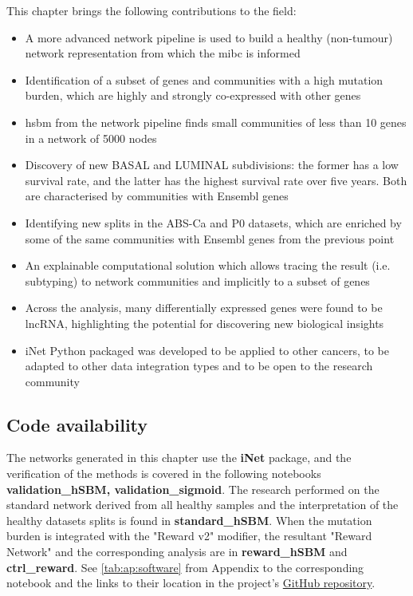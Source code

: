 This chapter brings the following contributions to the field:
\begin{itemize}
    \item A more advanced network pipeline is used to build a healthy (non-tumour) network representation from which the \acrshort{mibc} is informed
    \item Identification of a subset of genes and communities with a high mutation burden, which are highly and strongly co-expressed with other genes
    \item \acrlong{hsbm} from the network pipeline finds small communities of less than 10 genes in a network of 5000 nodes
    \item Discovery of new \gls{BASAL} and \gls{LUMINAL} subdivisions: the former has a low survival rate, and the latter has the highest survival rate over five years. Both are characterised by communities with Ensembl genes
    \item Identifying new splits in the ABS-Ca and P0 datasets, which are enriched by some of the same communities with Ensembl genes from the previous point 
    \item An explainable computational solution which allows tracing the result (i.e. subtyping) to network communities and implicitly to a subset of genes
    \item Across the analysis, many differentially expressed genes were found to be \acrlong{lncRNA}, highlighting the potential for discovering new biological insights
    \item iNet Python packaged was developed to be applied to other cancers, to be adapted to other data integration types and to be open to the research community
\end{itemize}

\subsection{Code availability} \label{s:N_II:implementation}

The networks generated in this chapter use the \textbf{iNet} package, and the verification of the methods is covered in the following notebooks \textbf{validation\_hSBM, validation\_sigmoid}. The research performed on the standard network derived from all healthy samples and the interpretation of the healthy datasets splits is found in \textbf{standard\_hSBM}. When the mutation burden is integrated with the "Reward v2" modifier, the resultant "Reward Network" and the corresponding analysis are in \textbf{reward\_hSBM} and \textbf{ctrl\_reward}. See \cref{tab:ap:software} from Appendix to the corresponding notebook and the links to their location in the project's \href{https://github.com/vladUng/PhD_thesis_exp/}{GitHub repository}.

